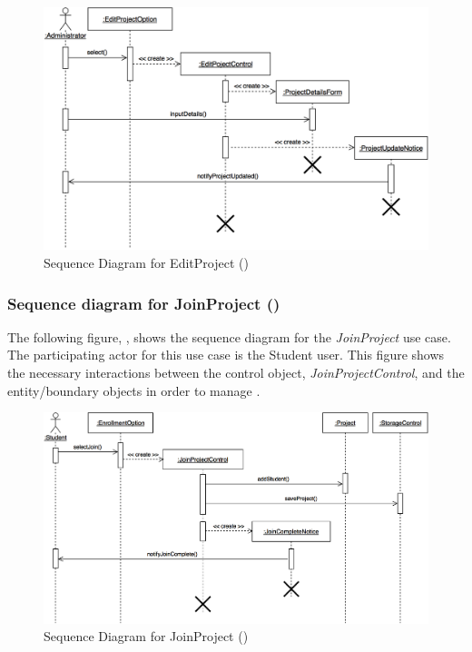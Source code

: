 \documentclass[12pt,letterpaper]{article}
\begin{document}
\begin{figure}[H]
	\centering{}
	\includegraphics[scale=0.25]{imgs/seq/edit-project.png}
	\caption[ - Sequence Diagram for EditProject]{Sequence Diagram for EditProject ()}
\end{figure}

\subsubsection*{Sequence diagram for JoinProject ()}

The following figure, , shows the sequence diagram for the {\it JoinProject} use case. The participating actor for this use case is
the Student user. This figure shows the necessary interactions between the control object, {\it JoinProjectControl}, and the
entity/boundary objects in order to manage .

\begin{figure}[H]
	\centering{}
	\includegraphics[scale=0.25]{imgs/seq/join-project.png}
	\caption[ - Sequence Diagram for JoinProject]{Sequence Diagram for JoinProject ()}
\end{figure}
\end{document}
